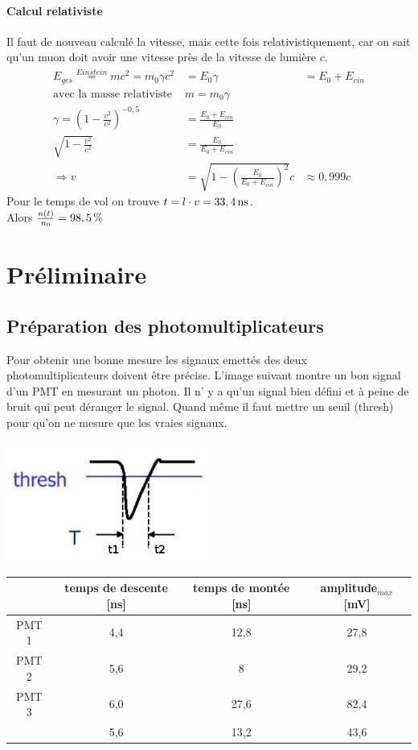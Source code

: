 \documentclass[a4paper,11pt,liststotocnumbered,bibtotocnumbered]{scrartcl}
\begin{document}
   \paragraph{Calcul relativiste}
   Il faut de nouveau calculé la vitesse, mais cette fois relativistiquement, car on sait qu'un muon doit avoir une vitesse près de la vitesse de lumière $c$. 
   \begin{eqnarray*}
    E_{ges}\stackrel{Einstein}{=}mc^2=m_0\gamma c^2&=E_0\gamma &=E_0+E_{cin}\\
    \text{avec la masse relativiste }&m=m_0\gamma&\\
    \gamma=\left(1-\frac{v^2}{c^2}\right)^{-0,5}&=\frac{E_0+E_{cin}}{E_0}&\\
    \sqrt{1-\frac{v^2}{c^2}}&=\frac{E_0}{E_0+E_{cin}}&\\
    \Rightarrow v&=\sqrt{1-\left(\frac{E_0}{E_0+E_{cin}}\right)^2}c&\approx 0,999c
   \end{eqnarray*}
   Pour le temps de vol on trouve $t=l\cdot v=\unit[33,4]{ns}$.\\
   Alors $\frac{n(t)}{n_0}=\unit[98,5]{\%}$
 

  
 \section{Préliminaire}
  \subsection{Préparation des photomultiplicateurs}
   Pour obtenir une bonne mesure les signaux emettés des deux photomultiplicateurs doivent être précise. L'image suivant montre un bon signal d'un PMT en mesurant un photon. Il n' y a qu'un signal bien défini et à peine de bruit qui peut déranger le signal. Quand même il faut mettre un seuil (thresh) pour qu'on ne mesure que les vraies signaux.  
   \begin{center}
    \includegraphics[width=0.5\textwidth]{bilder/pmtpuls.jpg}
   \end{center}
  \begin{tabular}{c|c|c|c}
      &temps de descente [ns]	&temps de montée [ns]	&amplitude$_{max}$ [mV]\\
    \hline
PMT 1	&	4,4	&	12,8	&	27,8	\\
PMT 2	&	5,6	&	8	&	29,2	\\
PMT 3	&	6,0	&	27,6	&	82,4	\\
	&	5,6	&	13,2	&	43,6	\\
   \end{tabular}
\newline
\end{document}
